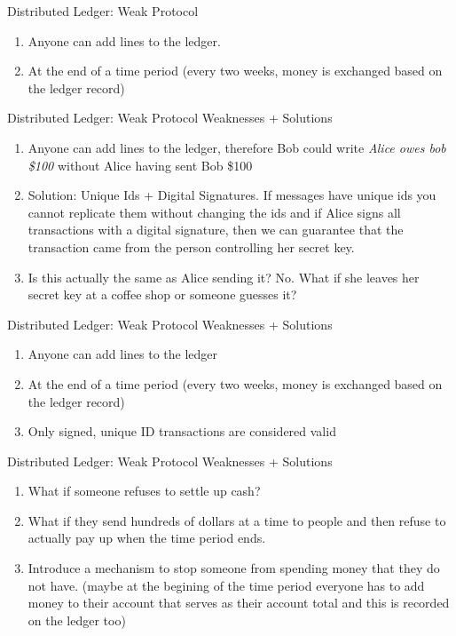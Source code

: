 \documentclass[handout]{beamer}
\begin{document}
\begin{frame}{Distributed Ledger: Weak Protocol}
    \begin{enumerate}
        \item \pause Anyone can add lines to the ledger.
        \item \pause At the end of a time period (every two weeks, money is exchanged based on the ledger record)
    \end{enumerate}
\end{frame}

\begin{frame}{Distributed Ledger: Weak Protocol Weaknesses + Solutions}
    \begin{enumerate}
        \item \pause Anyone can add lines to the ledger, therefore Bob could write \textit{Alice owes bob \$100} without Alice having sent Bob \$100
        \item \pause Solution: Unique Ids + Digital Signatures. If messages have unique ids you cannot replicate them without changing the ids and if Alice signs all transactions with a digital signature, then we can guarantee that the transaction came from the person controlling her secret key.
        \item \pause Is this actually the same as Alice sending it? No. What if she leaves her secret key at a coffee shop or someone guesses it?
    \end{enumerate}
\end{frame}

\begin{frame}{Distributed Ledger: Weak Protocol Weaknesses + Solutions}
    \begin{enumerate}
        \item \pause Anyone can add lines to the ledger
        \item \pause At the end of a time period (every two weeks, money is exchanged based on the ledger record)
        \item \pause Only signed, unique ID transactions are considered valid
    \end{enumerate}
\end{frame}

\begin{frame}{Distributed Ledger: Weak Protocol Weaknesses + Solutions}
    \begin{enumerate}
        \item \pause What if someone refuses to settle up cash?
        \item \pause What if they send hundreds of dollars at a time to people and then refuse to actually pay up when the time period ends.
        \item \pause Introduce a mechanism to stop someone from spending money that they do not have. (maybe at the begining of the time period everyone has to add money to their account that serves as their account total and this is recorded on the ledger too)
    \end{enumerate}
\end{frame}
\end{document}
